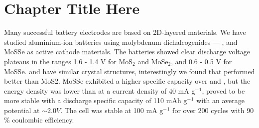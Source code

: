 \chapter{Chapter Title Here} %

\label{Chapter1} %


\newcommand{\keyword}[1]{\textbf{#1}}
\newcommand{\tabhead}[1]{\textbf{#1}}
\newcommand{\code}[1]{\texttt{#1}}
\newcommand{\file}[1]{\texttt{\bfseries#1}}
\newcommand{\option}[1]{\texttt{\itshape#1}}
Many successful battery electrodes are based on 2D-layered materials. We have studied aluminium-ion batteries using molybdenum dichalcogenides --- ,  and MoSSe as active cathode materials. The batteries showed clear discharge voltage plateaus in the ranges 1.6 - 1.4 V for MoS$_{2}$ and MoSe$_{2}$, and 0.6 - 0.5 V for MoSSe.  and  have similar crystal structures, interestingly we found that  performed better than MoS2. MoSSe exhibited a higher specific capacity over  and , but the energy density was lower than  at a current density of 40 mA g$^-{^1}$,  proved to be more stable with a discharge specific capacity of 110 mAh g$^-{^1}$ with an average potential at $\sim 2.0 V$. The cell was stable at 100 mA g$^-{^1}$ for over 200 cycles with 90 \% coulombic efficiency. 
